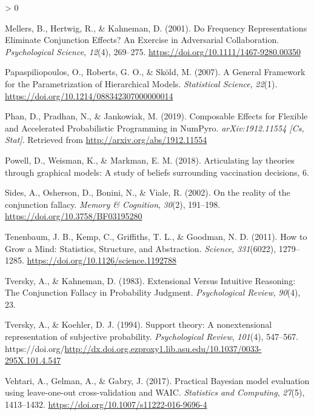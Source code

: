 \documentclass[
  english,
  man,floatsintext]{apa6}
\newlength{\cslhangindent}
\newenvironment{CSLReferences}[2] %
 {%
  \setlength{\parindent}{0pt}
  \ifodd #1 \everypar{\setlength{\hangindent}{\cslhangindent}}\ignorespaces\fi
  \ifnum #2 > 0
  \setlength{\parskip}{#2\baselineskip}
  \fi
 }%
 {}
\begin{document}
\begin{CSLReferences}{1}{0}
\leavevmode\hypertarget{ref-mellers.etal2001}{}%
Mellers, B., Hertwig, R., \& Kahneman, D. (2001). Do {Frequency Representations Eliminate Conjunction Effects}? {An Exercise} in {Adversarial Collaboration}. \emph{Psychological Science}, \emph{12}(4), 269--275. \url{https://doi.org/10.1111/1467-9280.00350}

\leavevmode\hypertarget{ref-papaspiliopoulos.etal2007}{}%
Papaspiliopoulos, O., Roberts, G. O., \& Sköld, M. (2007). A {General Framework} for the {Parametrization} of {Hierarchical Models}. \emph{Statistical Science}, \emph{22}(1). \url{https://doi.org/10.1214/088342307000000014}

\leavevmode\hypertarget{ref-phan.etal2019}{}%
Phan, D., Pradhan, N., \& Jankowiak, M. (2019). Composable {Effects} for {Flexible} and {Accelerated Probabilistic Programming} in {NumPyro}. \emph{arXiv:1912.11554 {[}Cs, Stat{]}}. Retrieved from \url{http://arxiv.org/abs/1912.11554}

\leavevmode\hypertarget{ref-powell.etal2018}{}%
Powell, D., Weisman, K., \& Markman, E. M. (2018). Articulating lay theories through graphical models: {A} study of beliefs surrounding vaccination decisions, 6.

\leavevmode\hypertarget{ref-sides.etal2002}{}%
Sides, A., Osherson, D., Bonini, N., \& Viale, R. (2002). On the reality of the conjunction fallacy. \emph{Memory \& Cognition}, \emph{30}(2), 191--198. \url{https://doi.org/10.3758/BF03195280}

\leavevmode\hypertarget{ref-tenenbaum.etal2011}{}%
Tenenbaum, J. B., Kemp, C., Griffiths, T. L., \& Goodman, N. D. (2011). How to {Grow} a {Mind}: {Statistics}, {Structure}, and {Abstraction}. \emph{Science}, \emph{331}(6022), 1279--1285. \url{https://doi.org/10.1126/science.1192788}

\leavevmode\hypertarget{ref-tversky.kahneman1983}{}%
Tversky, A., \& Kahneman, D. (1983). Extensional {Versus Intuitive Reasoning}: {The Conjunction Fallacy} in {Probability Judgment}. \emph{Psychological Review}, \emph{90}(4), 23.

\leavevmode\hypertarget{ref-tversky.koehler1994}{}%
Tversky, A., \& Koehler, D. J. (1994). Support theory: {A} nonextensional representation of subjective probability. \emph{Psychological Review}, \emph{101}(4), 547--567. https://doi.org/\url{http://dx.doi.org.ezproxy1.lib.asu.edu/10.1037/0033-295X.101.4.547}

\leavevmode\hypertarget{ref-vehtari.etal2017}{}%
Vehtari, A., Gelman, A., \& Gabry, J. (2017). Practical {Bayesian} model evaluation using leave-one-out cross-validation and {WAIC}. \emph{Statistics and Computing}, \emph{27}(5), 1413--1432. \url{https://doi.org/10.1007/s11222-016-9696-4}


\end{CSLReferences}
\end{document}
